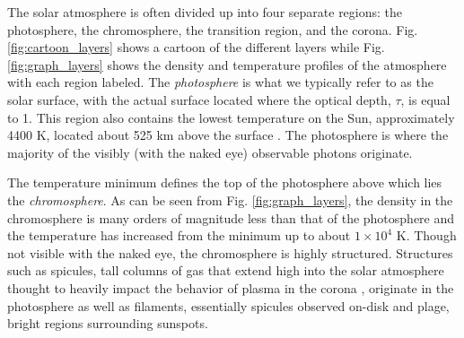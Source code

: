 \begin{enumerate}
\begin{enumerate}
				\par The solar atmosphere is often divided up into four separate regions: the photosphere, the chromosphere, the transition region, and the corona. Fig. \ref{fig:cartoon_layers} shows a cartoon of the different layers while Fig. \ref{fig:graph_layers} shows the density and temperature profiles of the atmosphere with each region labeled. The \textit{photosphere} is what we typically refer to as the solar surface, with the actual surface located where the optical depth, $\tau$, is equal to 1. This region also contains the lowest temperature on the Sun, approximately 4400 K, located about 525 km above the surface \citep{carroll_introduction_2007}. The photosphere is where the majority of the visibly (with the naked eye) observable photons originate.
				\par The temperature minimum defines the top of the photosphere above which lies the \textit{chromosphere}. As can be seen from Fig. \ref{fig:graph_layers}, the density in the chromosphere is many orders of magnitude less than that of the photosphere and the temperature has increased from the minimum up to about $1\times10^4$ K. Though not visible with the naked eye, the chromosphere is highly structured. Structures such as spicules, tall columns of gas that extend high into the solar atmosphere thought to heavily impact the behavior of plasma in the corona \citep{de_pontieu_origins_2011}, originate in the photosphere as well as filaments, essentially spicules observed on-disk and plage, bright regions surrounding sunspots.
				\begin{figure}[htbp]
					\centering
\end{figure}
\end{enumerate}
\end{enumerate}
